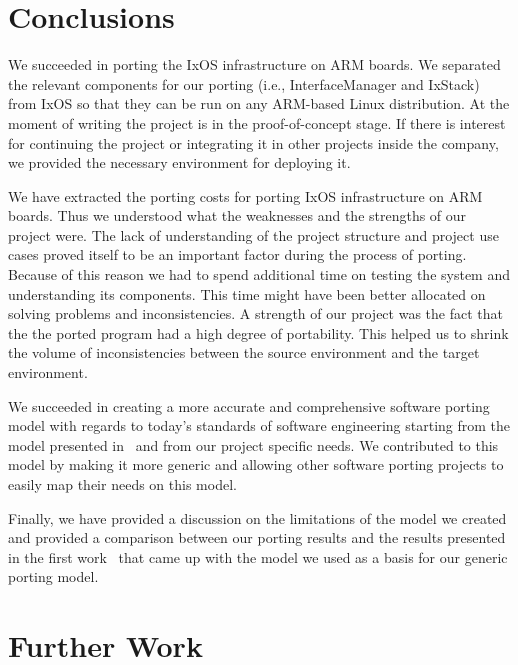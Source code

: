 \chapter{Conclusions} \label{sec:conclusions}

We succeeded in porting the IxOS infrastructure on ARM boards. We separated the
relevant components for our porting (i.e., InterfaceManager and IxStack) from
IxOS so that they can be run on any ARM-based Linux distribution. At the
moment of writing the project is in the proof-of-concept stage. If there is
interest for continuing the project or integrating it in other projects inside
the company, we provided the necessary environment for deploying it.~

We have extracted the porting costs for porting IxOS infrastructure on ARM
boards. Thus we understood what the weaknesses and the strengths of our project
were. The lack of understanding of the project structure and project use cases
proved itself to be an important factor during the process of porting. Because
of this reason we had to spend additional time on testing the system and
understanding its components. This time might have been better allocated on
solving problems and inconsistencies. A strength of our project was the fact
that the the ported program had a high degree of portability. This helped us to
shrink the volume of inconsistencies between the source environment and the
target environment.

We succeeded in creating a more accurate and comprehensive software porting
model with regards to today's standards of software engineering starting from
the model presented in~\cite{hakuta,tanaka} and from our project specific needs.
We contributed to this model by making it more generic and allowing other
software porting projects to easily map their needs on this model.

Finally, we have provided a discussion on the limitations of the model we
created and provided a comparison between our porting results and the results
presented in the first work~\cite{hakuta} that came up with the model we used as a
basis for our generic porting model.

\chapter{Further Work}


